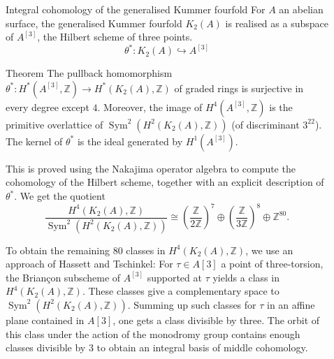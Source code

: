\documentclass[final]{beamer}
\newlength{\sepwid}
\newlength{\onecolwid}
\DeclareMathOperator{\Sym}{Sym}
\newcommand{\hilb}[1]{^{[#1]}}
\newcommand{\Z}{\mathbb{Z}}
\newcommand{\kum}[2]{K_{ #2 }( #1 )}
\newcommand{\X}{\kum{A}{2}}
\begin{document}
\begin{frame}[t]
\begin{columns}[t]
\begin{column}{\onecolwid}
\begin{block}{Integral cohomology of the generalised Kummer fourfold}
For $A$ an abelian surface, the generalised Kummer fourfold $\X$ is realised
as a subspace of $A\hilb{3}$, the Hilbert scheme of three points.
$$
\theta^* : \X  \hookrightarrow A\hilb{3}
$$
\begin{alertblock}{Theorem}
The pullback homomorphism $\theta^* : H^*(A\hilb{3},\Z)\rightarrow H^*(\X,\Z)$ of graded rings is surjective in every degree except $4$. 
Moreover, the image of $H^4(A\hilb{3},\Z)$ is the primitive overlattice of $\Sym^2(H^2(\X,\Z))$ (of discriminant $3^{22}$).
The kernel of $\theta^*$ is the ideal generated by $H^1(A\hilb{3})$.
\end{alertblock}
This is proved using the Nakajima operator algebra to compute the cohomology of the Hilbert scheme, together with an explicit description of $\theta^*$.
We get the quotient
$$
\frac{H^4(\X,\Z)}{\Sym^2(H^2(\X,\Z))} \cong \left(\frac{\Z}{2\Z}\right)^7 \oplus \left(\frac{\Z}{3\Z}\right)^8 \oplus \Z^{80}.
$$

To obtain the remaining $80$ classes in $H^4(\X,\Z)$, we use an approach of Hassett and Tschinkel:
For $\tau \in A[3] $ a point of three-torsion, the Brian\c con subscheme of $A\hilb{3}$ supported at $\tau$ yields a class in $H^4(\X,\Z)$. 
These classes give a complementary space to $\Sym^2(H^2(\X,\Z))$.
Summing up such classes for $\tau$ in an affine plane contained in $A[3]$, one gets a class divisible by three.
The orbit of this class under the action of the monodromy group contains enough classes divisible by $3$ to obtain an integral basis of middle cohomology.
\end{block}






\end{column} %


\begin{column}{\sepwid}\end{column} %

\begin{column}{\onecolwid} %


\end{column}
\end{columns}
\end{frame}
\end{document}
